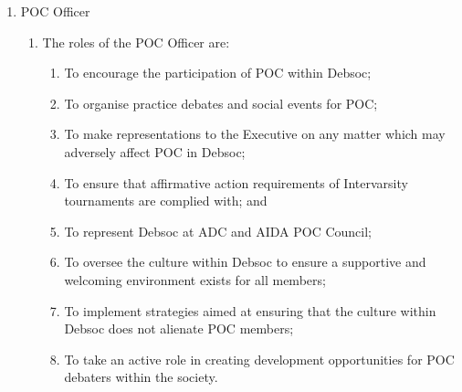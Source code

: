 \begin{enumerate}
\item POC Officer
  \begin{enumerate}
  \item The roles of the POC Officer are:
    \begin{enumerate}
    \item To encourage the participation of POC within Debsoc;
    \item To organise practice debates and social events for POC;
    \item To make representations to the Executive on any matter which may adversely affect POC in Debsoc;
    \item To ensure that affirmative action requirements of Intervarsity tournaments are complied with; and
    \item To represent Debsoc at ADC and AIDA POC Council;
    \item To oversee the culture within Debsoc to ensure a supportive and welcoming environment exists for all members;
    \item To implement strategies aimed at ensuring that the culture within Debsoc does not alienate POC members;
    \item To take an active role in creating development opportunities for POC debaters within the society.
    \end{enumerate}
  \end{enumerate}

\end{enumerate}
